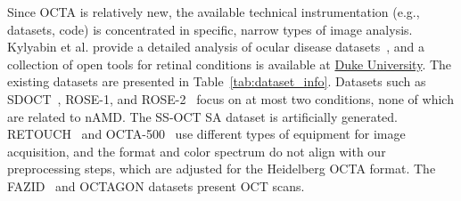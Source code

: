 \documentclass[conference]{IEEEtran}
\begin{document}
Since OCTA is relatively new, the available technical instrumentation (e.g., datasets, code) is concentrated in specific, narrow types of image analysis. Kylyabin et al. provide a detailed analysis of ocular disease datasets~\cite{kulyabin2024octdl}, and a collection of open tools for retinal conditions is available at \href{https://people.duke.edu/~sf59/software.html}{Duke University}. The existing datasets are presented in Table~\ref{tab:dataset_info}. 
Datasets such as SDOCT~\cite{farsiu2014quantitative}, ROSE-1, and ROSE-2~\cite{ma2020rose} focus on at most two conditions, none of which are related to nAMD. The SS-OCT SA dataset is artificially generated. RETOUCH~\cite{8653407} and OCTA-500~\cite{li2024octa} use different types of equipment for image acquisition, and the format and color spectrum do not align with our preprocessing steps, which are adjusted for the Heidelberg OCTA format. The FAZID~\cite{agarwal2020foveal} and OCTAGON datasets present OCT scans.
\end{document}
